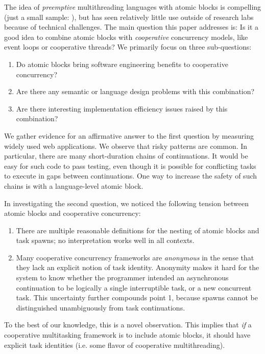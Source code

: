 \documentclass[acmsmall,anonymous,review]{acmart}\settopmatter{printfolios=true,printccs=false,printacmref=false}
\begin{document}

The idea of \emph{preemptive} multithreading languages with atomic blocks is compelling (just a small sample: \cite{Harris2003, Harris2005, Ringenburg2005, Herlihy2006, Ni2008}), but has seen relatively little use outside of research labs because of technical challenges.
The main question this paper addresses is: Is it a good idea to combine atomic blocks with \emph{cooperative} concurrency models, like event loops or cooperative threads?
We primarily focus on three sub-questions:
\begin{enumerate}
\item Do atomic blocks bring software engineering benefits to cooperative concurrency?
\item Are there any semantic or language design problems with this combination?
\item Are there interesting implementation efficiency issues raised by this combination?
\end{enumerate}

We gather evidence for an affirmative answer to the first question by measuring widely used web applications\footnotemark{}.
We observe that risky patterns are common.
In particular, there are many short-duration chains of continuations.
It would be easy for such code to pass testing, even though it is possible for conflicting tasks to execute in gaps between continuations.
One way to increase the safety of such chains is with a language-level atomic block.


In investigating the second question, we noticed the following tension between atomic blocks and cooperative concurrency:
\begin{enumerate}
\item There are multiple reasonable definitions for the nesting of atomic blocks and task spawns; no interpretation works well in all contexts.
\item Many cooperative concurrency frameworks are \emph{anonymous} in the sense that they lack an explicit notion of task identity.
  Anonymity makes it hard for the system to know whether the programmer intended an asynchronous continuation to be logically a single interruptible task, or a new concurrent task.
  This uncertainty further compounds point 1, because spawns cannot be distinguished unambiguously from task continuations.
\end{enumerate}
To the best of our knowledge, this is a novel observation.
This implies that \emph{if} a cooperative multitasking framework is to include atomic blocks, it should have explicit task identities (i.e. some flavor of cooperative multithreading).
\end{document}
